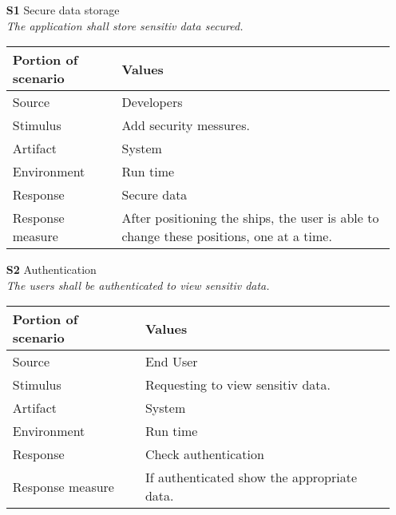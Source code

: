 \begin{itemize}
    \item[\textbf{S1}] Secure data storage \\
    \textit{\small{The application shall store sensitiv data secured.}}
        
    \begin{tabular}{| l | p{7cm} |}
        \hline
        \rowcolor[gray]{0.8}
        \textbf{Portion of scenario} & \textbf{Values} \\
        \hline
        Source & Developers \\
        Stimulus & Add security messures. \\
        Artifact & System \\
        Environment & Run time \\
        Response & Secure data  \\
        Response measure & After positioning the ships, the user is able to change these positions, one at a time. \\
        \hline
    \end{tabular}

    \item[\textbf{S2}] Authentication \\
    \textit{\small{The users shall be authenticated to view sensitiv data.}}
        
    \begin{tabular}{| l | p{7cm} |}
        \hline
        \rowcolor[gray]{0.8}
        \textbf{Portion of scenario} & \textbf{Values} \\
        \hline
        Source & End User \\
        Stimulus & Requesting to view sensitiv data. \\
        Artifact & System \\
        Environment & Run time \\
        Response & Check authentication \\
        Response measure & If authenticated show the appropriate data. \\
        \hline
    \end{tabular}
\end{itemize}